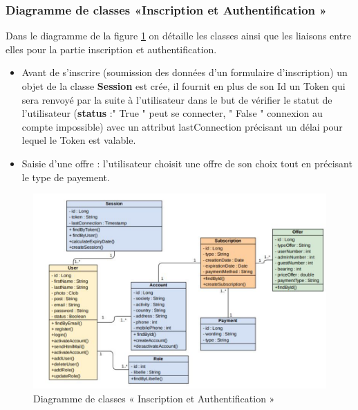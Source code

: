 \subsubsection{	Diagramme de classes «Inscription et Authentification  »}
\hspace{4mm}Dans le diagramme de la figure \ref{fig:class_auth} on détaille les classes ainsi que les liaisons entre elles  pour la partie inscription et authentification.
\begin{itemize}
    \item 	Avant de s’inscrire (soumission des données d’un formulaire d’inscription) un objet de la classe \textbf{Session} est crée, il fournit en plus de son Id  un Token qui sera renvoyé par la suite à l’utilisateur dans le but de vérifier le statut de l’utilisateur (\textbf{status} :" True " peut se connecter, " False " connexion au compte impossible) avec un attribut lastConnection précisant un délai pour lequel le Token est valable.
    \item 	Saisie d’une offre : l’utilisateur choisit une offre de son choix tout en précisant le type de payement.  
\end{itemize}
\begin{figure}[h]
    \centering
    \includegraphics{figures/33Anis1.png}
    \caption{Diagramme de classes « Inscription et Authentification  »}
    \label{fig:class_auth}
\end{figure}\newpage
